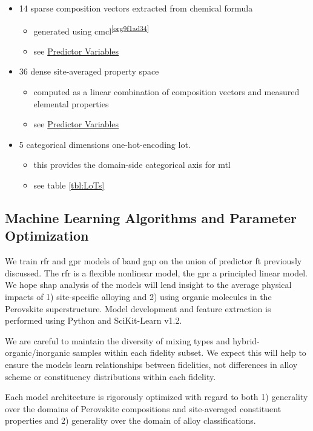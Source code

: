 \documentclass[aip, jmp, amsmath, amssymb, nofootinbib]{revtex4-2}
\begin{document}
\begin{itemize}
\item 14 sparse composition vectors extracted from chemical formula
\begin{itemize}
\item generated using cmcl\textsuperscript{\ref{org9f1ad34}}
\item see \hyperref[sec:orgc3205dc]{Predictor Variables}
\end{itemize}
\item 36 dense site-averaged property space
\begin{itemize}
\item computed as a linear combination of composition vectors and
measured elemental properties\cite{mentel-2014}
\item see \hyperref[sec:orgc3205dc]{Predictor Variables}
\end{itemize}
\item 5 categorical dimensions one-hot-encoding \gls{lot}.
\begin{itemize}
\item this provides the domain-side categorical axis for \gls{mtl}
\item see table \ref{tbl:LoTs}
\end{itemize}
\end{itemize}

\subsection*{Machine Learning Algorithms and Parameter Optimization}
\label{sec:org5b69c0a}
We train \acrshort{rfr} and \acrshort{gpr} models of band gap on the union of predictor
\gls{ft} previously discussed. The \acrshort{rfr} is a flexible nonlinear model,
the \acrshort{gpr} a principled linear model. We hope \Acrfull{shap} analysis of the models will lend insight to the
average physical impacts of 1) site-specific alloying and 2) using
organic molecules in the Perovskite superstructure.  Model development
and feature extraction is performed using Python and
SciKit-Learn\cite{pedregosa-2011-scikit-learn} v1.2.

We are careful to maintain the diversity of mixing types and
hybrid-organic/inorganic samples within each fidelity subset. We
expect this will help to ensure the models learn relationships between
fidelities, not differences in alloy scheme or constituency
distributions within each fidelity.

Each model architecture is rigorously optimized with regard to both 1)
generality over the domains of Perovskite compositions and
site-averaged constituent properties and 2) generality over the domain
of alloy classifications.
\end{document}
